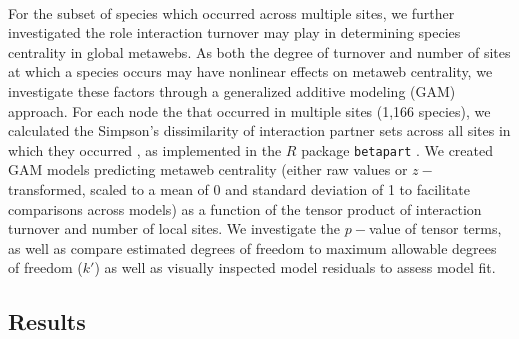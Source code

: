 \documentclass[12pt]{article}
\begin{document}
\paragraph{}
For the subset of species which occurred across multiple sites, we further investigated the role interaction turnover may play in determining species centrality in global metawebs. As both the degree of turnover and number of sites at which a species occurs may have nonlinear effects on metaweb centrality, we investigate these factors through a generalized additive modeling (GAM) approach. For each node the that occurred in multiple sites (1,166 species), we calculated the Simpson's dissimilarity of interaction partner sets across all sites in which they occurred \citep{baselga2015comparing}, as implemented in the $R$ package \texttt{betapart} \citep{baselga2012betapart}. We created GAM models predicting metaweb centrality (either raw values or $z-$transformed, scaled to a mean of 0 and standard deviation of 1 to facilitate comparisons across models) as a function of the tensor product of interaction turnover and number of local sites. We investigate the $p-$value of tensor terms, as well as compare estimated degrees of freedom to maximum allowable degrees of freedom ($k'$) as well as visually inspected model residuals to assess model fit. %



\subsection*{Results}
\end{document}
